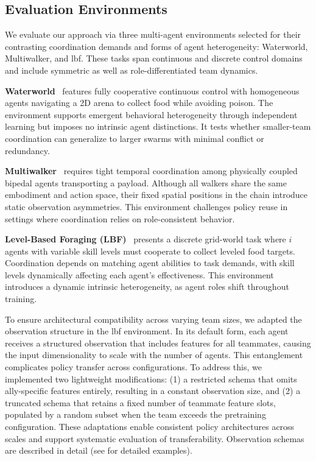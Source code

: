 \subsection{Evaluation Environments} 

We evaluate our approach via three multi-agent environments selected for their contrasting 
coordination demands and forms of agent heterogeneity: 
Waterworld, Multiwalker, and \gls{lbf}. These tasks span continuous 
and discrete control domains and include symmetric as well as role-differentiated team dynamics.

\textbf{Waterworld}~\cite{gupta2017} features fully cooperative continuous control 
with homogeneous agents navigating a 2D arena to collect food while avoiding poison. 
The environment supports emergent behavioral heterogeneity through independent learning 
but imposes no intrinsic agent distinctions. It tests whether smaller-team coordination 
can generalize to larger swarms with minimal conflict or redundancy.

\textbf{Multiwalker}~\cite{gupta2017} requires tight temporal coordination among physically 
coupled bipedal agents transporting a payload. Although all walkers share the same embodiment 
and action space, their fixed spatial positions in the chain introduce static observation 
asymmetries. This environment challenges policy reuse in settings where coordination relies 
on role-consistent behavior.

\textbf{Level-Based Foraging (LBF)}~\cite{papoudakis2021} presents a discrete grid-world task 
where \(i\) agents with variable skill levels must cooperate to collect leveled food targets. 
Coordination depends on matching agent abilities to task demands, with skill levels 
dynamically affecting each agent's effectiveness. This environment introduces a dynamic 
intrinsic heterogeneity, as agent roles shift throughout training.

To ensure architectural compatibility across varying team sizes, we adapted the observation 
structure in the \gls{lbf} environment. In its default form, 
each agent receives a structured observation that includes features for all teammates, 
causing the input dimensionality to scale with the number of agents. 
This entanglement complicates policy transfer across configurations. 
To address this, we implemented two lightweight modifications: 
(1) a restricted schema that omits ally-specific features entirely, 
resulting in a constant observation size, and 
(2) a truncated schema that retains a fixed number of teammate feature slots, 
populated by a random subset when the team exceeds the pretraining configuration. 
These adaptations enable consistent policy architectures across scales and support 
systematic evaluation of transferability.
Observation schemas are described in detail
(see  for detailed examples).

